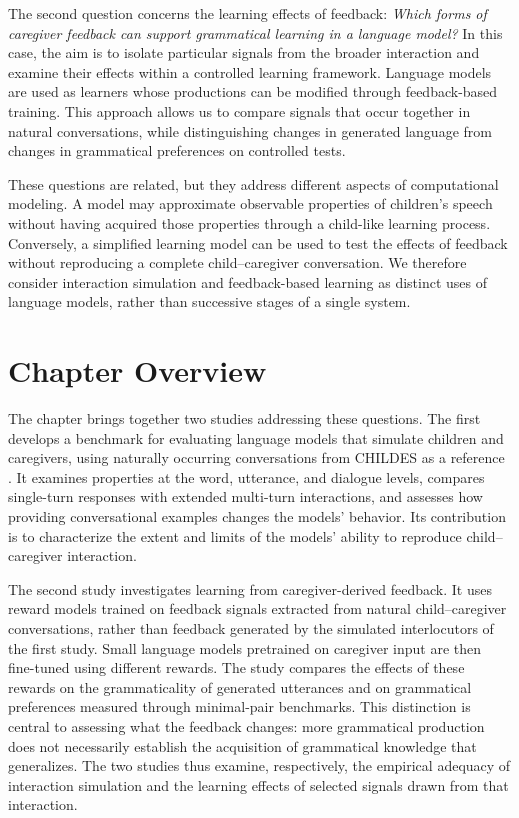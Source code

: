 The second question concerns the learning effects of feedback: \textit{Which forms of caregiver feedback can support grammatical learning in a language model?} In this case, the aim is to isolate particular signals from the broader interaction and examine their effects within a controlled learning framework. Language models are used as learners whose productions can be modified through feedback-based training. This approach allows us to compare signals that occur together in natural conversations, while distinguishing changes in generated language from changes in grammatical preferences on controlled tests.

These questions are related, but they address different aspects of computational modeling. A model may approximate observable properties of children's speech without having acquired those properties through a child-like learning process. Conversely, a simplified learning model can be used to test the effects of feedback without reproducing a complete child--caregiver conversation. We therefore consider interaction simulation and feedback-based learning as distinct uses of language models, rather than successive stages of a single system.

\section{Chapter Overview}

The chapter brings together two studies addressing these questions. The first develops a benchmark for evaluating language models that simulate children and caregivers, using naturally occurring conversations from CHILDES as a reference \citep{macwhinney2000childes}. It examines properties at the word, utterance, and dialogue levels, compares single-turn responses with extended multi-turn interactions, and assesses how providing conversational examples changes the models' behavior. Its contribution is to characterize the extent and limits of the models' ability to reproduce child--caregiver interaction.

The second study investigates learning from caregiver-derived feedback. It uses reward models trained on feedback signals extracted from natural child--caregiver conversations, rather than feedback generated by the simulated interlocutors of the first study. Small language models pretrained on caregiver input are then fine-tuned using different rewards. The study compares the effects of these rewards on the grammaticality of generated utterances and on grammatical preferences measured through minimal-pair benchmarks. This distinction is central to assessing what the feedback changes: more grammatical production does not necessarily establish the acquisition of grammatical knowledge that generalizes. The two studies thus examine, respectively, the empirical adequacy of interaction simulation and the learning effects of selected signals drawn from that interaction.
